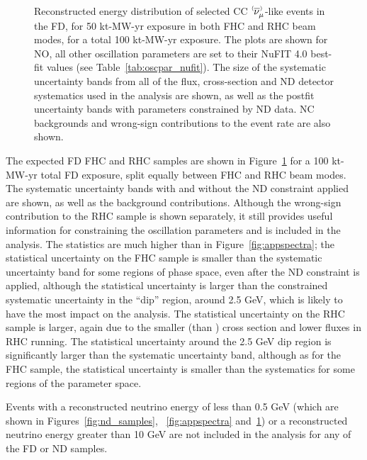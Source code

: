 \begin{figure}[htbp]
  \\
\caption{Reconstructed energy distribution of selected CC $\;\nu^{\bracketbar}_{\mu}$-like events in the FD, for 50 kt-MW-yr exposure in both FHC and RHC beam modes, for a total 100 kt-MW-yr exposure. The plots are shown for NO, all other oscillation parameters are set to their NuFIT 4.0 best-fit values (see Table~\ref{tab:oscpar_nufit}). The size of the systematic uncertainty bands from all of the flux, cross-section and ND detector systematics used in the analysis are shown, as well as the postfit uncertainty bands with parameters constrained by ND data. NC backgrounds and wrong-sign contributions to the event rate are also shown.}
\label{fig:disspectra}
\end{figure}
The expected FD FHC \numu and RHC \anumu samples are shown in Figure~\ref{fig:disspectra} for a 100 kt-MW-yr total FD exposure, split equally between FHC and RHC beam modes. The systematic uncertainty bands with and without the ND constraint applied are shown, as well as the background contributions. Although the wrong-sign \numu contribution to the RHC \anumu sample is shown separately, it still provides useful information for constraining the oscillation parameters and is included in the analysis. The statistics are much higher than in Figure~\ref{fig:appspectra}; the statistical uncertainty on the \numu FHC sample is smaller than the systematic uncertainty band for some regions of phase space, even after the ND constraint is applied, although the statistical uncertainty is larger than the constrained systematic uncertainty in the ``dip'' region, around 2.5 GeV, which is likely to have the most impact on the analysis. The statistical uncertainty on the \anumu RHC sample is larger, again due to the smaller \anumu (than \numu) cross section and lower fluxes in RHC running. The statistical uncertainty around the 2.5 GeV dip region is significantly larger than the systematic uncertainty band, although as for the FHC \numu sample, the statistical uncertainty is smaller than the systematics for some regions of the parameter space.

Events with a reconstructed neutrino energy of less than 0.5 GeV (which are shown in Figures~\ref{fig:nd_samples}, ~\ref{fig:appspectra} and~\ref{fig:disspectra}) or a reconstructed neutrino energy greater than 10 GeV are not included in the analysis for any of the FD or ND samples.



